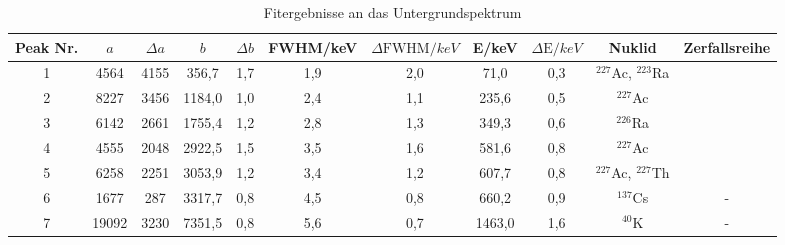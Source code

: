 \begin{table}
\caption{Fitergebnisse an das Untergrundspektrum}
\begin{tabular}{ccccccccccc}
\toprule
Peak Nr. & $a$ & $\Delta a$ & $b$ & $\Delta b$ & FWHM/\si{keV} & $\Delta \text{FWHM}/\si{keV}$& E/\si{keV}& $\Delta\text{E}/\si{keV}$ & Nuklid & Zerfallsreihe\\
\midrule 
1	&	4564	&	4155	&	356,7	&	1,7	&	1,9	&	2,0	&	71,0	&	0,3	&	$^{227}$Ac, $^{223}$Ra\\
2	&	8227	&	3456	&	1184,0	&	1,0	&	2,4	&	1,1	&	235,6	&	0,5	&	$^{227}$Ac\\
3	&	6142	&	2661	&	1755,4	&	1,2	&	2,8	&	1,3	&	349,3	&	0,6	&	$^{226}$Ra \\
4	&	4555	&	2048	&	2922,5	&	1,5	&	3,5	&	1,6	&	581,6	&	0,8	&	$^{227}$Ac \\
5	&	6258	&	2251	&	3053,9	&	1,2	&	3,4	&	1,2	&	607,7	&	0,8	&	$^{227}$Ac, $^{227}$Th\\
6	&	1677	&	287	&	3317,7	&	0,8	&	4,5	&	0,8	&	660,2	&	0,9	&	$^{137}$Cs & -\\
7	&	19092	&	3230	&	7351,5	&	0,8	&	5,6	&	0,7	&	1463,0	&	1,6	&	$^{40}$K & -\\
\bottomrule
\end{tabular}
\label{tab:ge}
\end{table}